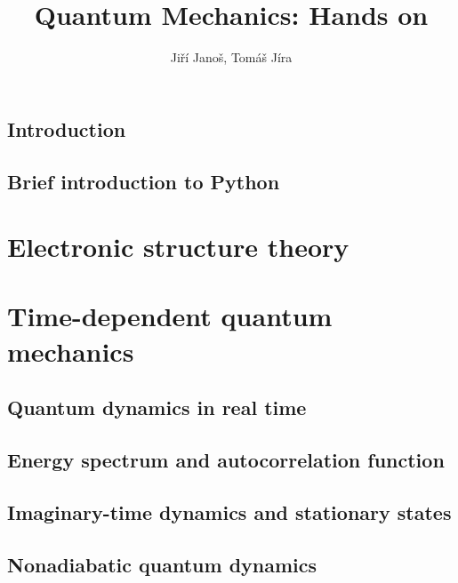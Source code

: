 \documentclass[paper=b5,parskip=half,open=any,headsepline=true,11pt]{scrbook}
\title{Quantum Mechanics: Hands on}
\author{Jiří Janoš, Tomáš Jíra}
\begin{document}
\frontmatter
\pagestyle{scrheadings}



{ \hypersetup{hidelinks} \tableofcontents }

\chapter{Introduction}
\label{kap:uvod}


\chapter{Brief introduction to Python}
\label{kap:python}


\mainmatter

\part{Electronic structure theory}
\label{part:elstruc}



\part{Time-dependent quantum mechanics}
\label{part:tdqm}

\chapter{Quantum dynamics in real time}
\label{kap:qd}


\chapter{Energy spectrum and autocorrelation function}
\label{kap:spec}


\chapter{Imaginary-time dynamics and stationary states}
\label{kap:imqd}


\chapter{Nonadiabatic quantum dynamics}
\label{kap:nonad}
% 
\end{document}
